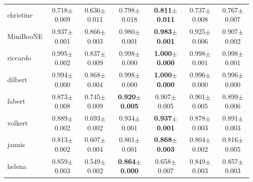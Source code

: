 \begin{tabular}{lcccccc}
christine & 0.718{\tiny$\pm$0.009} & 0.636{\tiny$\pm$0.011} & 0.798{\tiny$\pm$0.018} & \textbf{0.811{\tiny$\pm$0.011}} & 0.737{\tiny$\pm$0.008} & 0.767{\tiny$\pm$0.007} \\
MiniBooNE & 0.937{\tiny$\pm$0.001} & 0.866{\tiny$\pm$0.003} & 0.980{\tiny$\pm$0.001} & \textbf{0.983{\tiny$\pm$0.001}} & 0.925{\tiny$\pm$0.006} & 0.907{\tiny$\pm$0.002} \\
riccardo & 0.995{\tiny$\pm$0.002} & 0.837{\tiny$\pm$0.009} & 0.998{\tiny$\pm$0.000} & \textbf{1.000{\tiny$\pm$0.000}} & 0.998{\tiny$\pm$0.001} & 0.998{\tiny$\pm$0.001} \\
dilbert & 0.994{\tiny$\pm$0.000} & 0.868{\tiny$\pm$0.004} & 0.998{\tiny$\pm$0.000} & \textbf{1.000{\tiny$\pm$0.000}} & 0.996{\tiny$\pm$0.000} & 0.996{\tiny$\pm$0.000} \\
fabert & 0.873{\tiny$\pm$0.008} & 0.745{\tiny$\pm$0.009} & \textbf{0.920{\tiny$\pm$0.005}} & 0.907{\tiny$\pm$0.005} & 0.901{\tiny$\pm$0.005} & 0.899{\tiny$\pm$0.006} \\
volkert & 0.889{\tiny$\pm$0.002} & 0.693{\tiny$\pm$0.002} & 0.934{\tiny$\pm$0.001} & \textbf{0.937{\tiny$\pm$0.001}} & 0.878{\tiny$\pm$0.003} & 0.891{\tiny$\pm$0.003} \\
jannis & 0.813{\tiny$\pm$0.002} & 0.607{\tiny$\pm$0.004} & 0.861{\tiny$\pm$0.001} & \textbf{0.868{\tiny$\pm$0.003}} & 0.804{\tiny$\pm$0.002} & 0.816{\tiny$\pm$0.005} \\
helena & 0.859{\tiny$\pm$0.003} & 0.549{\tiny$\pm$0.002} & \textbf{0.864{\tiny$\pm$0.000}} & 0.658{\tiny$\pm$0.007} & 0.849{\tiny$\pm$0.003} & 0.857{\tiny$\pm$0.003} \\
\bottomrule
\end{tabular}
